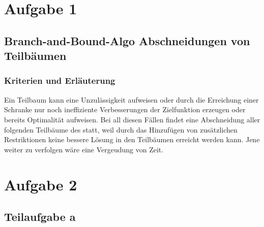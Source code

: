 \documentclass[a4paper,11pt]{article}
\begin{document}
\raggedright %

\section*{Aufgabe 1}

\subsection*{Branch-and-Bound-Algo Abschneidungen von Teilbäumen} 
\subsubsection*{Kriterien und Erläuterung}
    Ein Teilbaum kann eine Unzulässigkeit aufweisen oder durch die Erreichung einer Schranke nur noch ineffiziente Verbesserungen der Zielfunktion erzeugen oder bereits Optimalität aufweisen. Bei all diesen Fällen findet eine Abschneidung aller folgenden Teilbäume des statt, weil durch das Hinzufügen von zusätzlichen Restriktionen keine bessere Lösung in den Teilbäumen erreicht werden kann. Jene weiter zu verfolgen wäre eine Vergeudung von Zeit.
\bigbreak

\section*{Aufgabe 2}

\subsection*{Teilaufgabe a}
\end{document}
